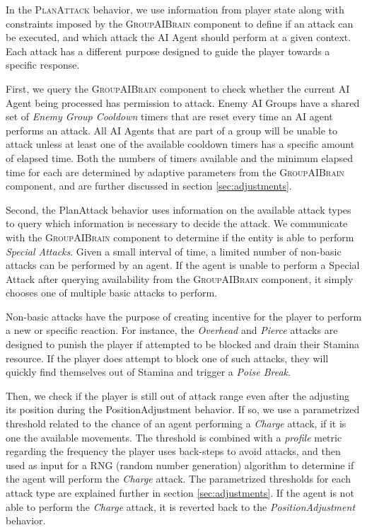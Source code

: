 In the \textsc{PlanAttack} behavior, we use information from player state along with constraints imposed by the \textsc{GroupAIBrain} component to define if an attack can be executed, and which attack the AI Agent should perform at a given context. Each attack has a different purpose designed to guide the player towards a specific response.

First, we query the \textsc{GroupAIBrain} component to check whether the current AI Agent being processed has permission to attack. Enemy AI Groups have a shared set of \emph{Enemy Group Cooldown} timers that are reset every time an AI agent performs an attack. All AI Agents that are part of a group will be unable to attack unless at least one of the available cooldown timers has a specific amount of elapsed time. Both the numbers of timers available and the minimum elapsed time for each are determined by adaptive parameters from the \textsc{GroupAIBrain} component, and are further discussed in section \ref{sec:adjustments}.

Second, the PlanAttack behavior uses information on the available attack types to query which information is necessary to decide the attack. We communicate with the \textsc{GroupAIBrain} component to determine if the entity is able to perform \emph{Special Attacks}. Given a small interval of time, a limited number of non-basic attacks can be performed by an agent. If the agent is unable to perform a Special Attack after querying availability from the \textsc{GroupAIBrain} component, it simply chooses one of multiple basic attacks to perform.

Non-basic attacks have the purpose of creating incentive for the player to perform a new or specific reaction. For instance, the \emph{Overhead} and \emph{Pierce} attacks are designed to punish the player if attempted to be blocked and drain their Stamina resource. If the player does attempt to block one of such attacks, they will quickly find themselves out of Stamina and trigger a \emph{Poise Break}.

Then, we check if the player is still out of attack range even after the adjusting its position during the PositionAdjustment behavior. If so, we use a parametrized threshold related to the chance of an agent performing a \emph{Charge} attack, if it is one the available movements. The threshold is combined with a \emph{profile} metric regarding the frequency the player uses back-steps to avoid attacks, and then used as input for a RNG (random number generation) algorithm to determine if the agent will perform the \emph{Charge} attack. The parametrized thresholds for each attack type are explained further in section \ref{sec:adjustments}. If the agent is not able to perform the \emph{Charge} attack, it is reverted back to the \emph{PositionAdjustment} behavior.

